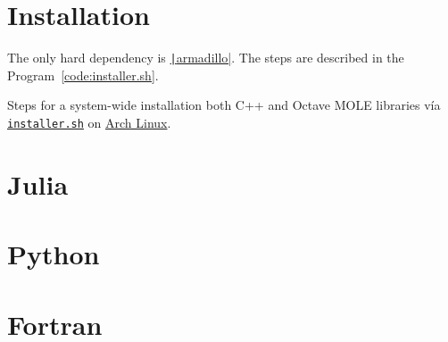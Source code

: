 \appendix

\chapter{Installation}

The only hard dependency is
\href{https://arma.sourceforge.net/docs.html}{\texttt|armadillo|}.
The steps are described in the Program~\ref{code:installer.sh}.

\begin{listing}[ht!]
    \tiny
    \centering
    \caption{Steps for a system-wide installation both C++ and Octave
        MOLE libraries vía \href{https://raw.githubusercontent.com/carlosal1015/mole_examples/main/homework/installer.sh}{\texttt{installer.sh}} on
        \href{https://archlinux.org}{Arch Linux}.}
    \label{code:installer.sh}
\end{listing}

\chapter{Julia}

\chapter{Python}

\chapter{Fortran}

\nocite{*}
\printbibliography[title={References}]